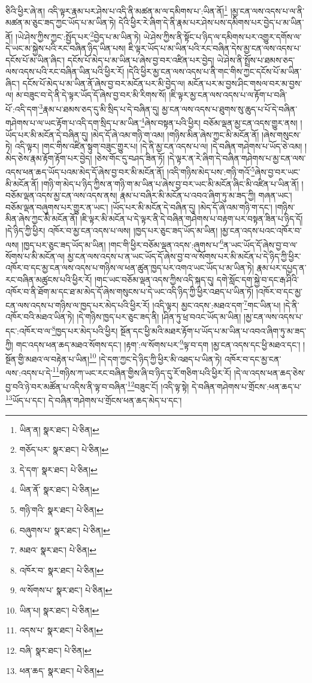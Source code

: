 ཅིའི་ཕྱིར་ཞེ་ན། འདི་ལྟར་རྣམ་པར་ཤེས་པ་འདི་ནི་མཚན་མ་ལ་དམིགས་པ་:ཡིན་ནོ།\footnote{ཡིན་ན།  སྣར་ཐང་།  པེ་ཅིན། } །མྱ་ངན་ལས་འདས་པ་ལ་ནི་མཚན་མ་ཅུང་ཟད་ཀྱང་ཡོད་པ་མ་ཡིན་ཏེ། དེའི་ཕྱིར་རེ་ཞིག་དེ་ནི་རྣམ་པར་ཤེས་པས་དམིགས་པར་བྱེད་པ་མ་ཡིན་ནོ། །ཡེ་ཤེས་ཀྱིས་ཀྱང་:སྤྱོད་པར་\footnote{གཅོད་པར་  སྣར་ཐང་།  པེ་ཅིན། }བྱེད་པ་མ་ཡིན་ཏེ། ཡེ་ཤེས་ཀྱིས་ནི་སྟོང་པ་ཉིད་ལ་དམིགས་པར་འགྱུར་དགོས་ལ་དེ་ཡང་མ་སྐྱེས་པའི་རང་བཞིན་ཉིད་ཡིན་པས། ཇི་ལྟར་ཡོད་པ་མ་ཡིན་པའི་རང་བཞིན་དེས་མྱ་ངན་ལས་འདས་པ་དངོས་པོ་མ་ཡིན་ཞིང་། དངོས་པོ་མེད་པ་མ་ཡིན་པ་ཞེས་བྱ་བར་འཛིན་པར་བྱེད། ཡེ་ཤེས་ནི་སྤྲོས་པ་ཐམས་ཅད་ལས་འདས་པའི་རང་བཞིན་ཡིན་པའི་ཕྱིར་རོ། །དེའི་ཕྱིར་མྱ་ངན་ལས་འདས་པ་ནི་གང་གིས་ཀྱང་དངོས་པོ་མ་ཡིན་ཞིང་། དངོས་པོ་མེད་པ་མ་ཡིན་ནོ་ཞེས་བྱ་བར་མངོན་པར་མི་བྱེད་ལ། མངོན་པར་མ་བྱས་ཤིང་གསལ་བར་མ་བྱས་ལ། མ་བཟུང་བ་དེ་ནི་དེ་ལྟར་ཡོད་དོ་ཞེས་བྱ་བར་མི་རིགས་སོ། །ཇི་ལྟར་མྱ་ངན་ལས་འདས་པ་ལ་རྟོག་པ་བཞི་པོ་:འདི་དག་\footnote{དེ་དག་  སྣར་ཐང་།  པེ་ཅིན། }རྣམ་པ་ཐམས་ཅད་དུ་མི་སྲིད་པ་དེ་བཞིན་དུ། མྱ་ངན་ལས་འདས་པ་ཐུགས་སུ་ཆུད་པ་པོ་དེ་བཞིན་གཤེགས་པ་ལ་ཡང་རྟོག་པ་འདི་དག་སྲིད་པ་མ་ཡིན་\footnote{ཡིན་ནོ་  སྣར་ཐང་།  པེ་ཅིན། }ཞེས་བསྟན་པའི་ཕྱིར། བཅོམ་ལྡན་མྱ་ངན་འདས་གྱུར་ནས། །ཡོད་པར་མི་མངོན་དེ་བཞིན་དུ། །མེད་དོ་ཞེ་འམ་གཉི་ག་འམ། །གཉིས་མིན་ཞེས་ཀྱང་མི་མངོན་ནོ། །ཞེས་གསུངས་ཏེ། འདི་ལྟར། །གང་གིས་འཛིན་སྟུག་བཟུང་གྱུར་པ། །དེ་ནི་མྱ་ངན་འདས་པ་ལ། །དེ་བཞིན་གཤེགས་པ་ཡོད་ཅེ་འམ། །མེད་ཅེས་རྣམ་རྟོག་རྟོག་པར་བྱེད། །ཅེས་གོང་དུ་བཤད་ཟིན་ཏོ། །དེ་ལྟར་ན་རེ་ཞིག་དེ་བཞིན་གཤེགས་པ་མྱ་ངན་ལས་འདས་ཕན་ཆད་ཡོད་པའམ་མེད་དོ་ཞེས་བྱ་བར་མི་མངོན་ནོ། །འདི་གཉིས་མེད་པས་:གཉི་གའོ་\footnote{གཉི་གའི་  སྣར་ཐང་།  པེ་ཅིན། }ཞེས་བྱ་བར་ཡང་མི་མངོན་ནོ། །གཉི་ག་མེད་པ་ཉིད་ཀྱིས་ན་གཉི་ག་མ་ཡིན་པ་ཞེས་བྱ་བར་ཡང་མི་མངོན་ཞིང་མི་འཛིན་པ་ཡིན་ནོ། །བཅོམ་ལྡན་འདས་མྱ་ངན་ལས་འདས་ནས། རྣམ་པ་བཞིར་མི་མངོན་པ་འབའ་ཞིག་ཏུ་མ་ཟད་ཀྱི། གཞན་ཡང་། བཅོམ་ལྡན་བཞུགས་པར་གྱུར་ན་ཡང་། །ཡོད་པར་མི་མངོན་དེ་བཞིན་དུ། །མེད་དོ་ཞེ་འམ་གཉི་ག་དང་། །གཉིས་མིན་ཞེས་ཀྱང་མི་མངོན་ནོ། །ཇི་ལྟར་མི་མངོན་པ་དེ་ལྟར་ནི་དེ་བཞིན་གཤེགས་པ་བརྟག་པར་བསྟན་ཟིན་པ་ཉིད་དོ། །དེ་ཉིད་ཀྱི་ཕྱིར། འཁོར་བ་མྱ་ངན་འདས་པ་ལས། །ཁྱད་པར་ཅུང་ཟད་ཡོད་མ་ཡིན། །མྱ་ངན་འདས་པའང་འཁོར་བ་ལས། །ཁྱད་པར་ཅུང་ཟད་ཡོད་མ་ཡིན། །གང་གི་ཕྱིར་བཅོམ་ལྡན་འདས་:ཞུགས་པ་\footnote{བཞུགས་པ་  སྣར་ཐང་།  པེ་ཅིན། }ན་ཡང་ཡོད་དོ་ཞེས་བྱ་བ་ལ་སོགས་པ་མི་མངོན་ལ། མྱ་ངན་ལས་འདས་པ་ན་ཡང་ཡོད་དོ་ཞེས་བྱ་བ་ལ་སོགས་པར་མི་མངོན་པ་དེ་ཉིད་ཀྱི་ཕྱིར་འཁོར་བ་དང་མྱ་ངན་ལས་འདས་པ་གཉིས་ལ་ཕན་ཚུན་ཁྱད་པར་འགའ་ཡང་ཡོད་པ་མ་ཡིན་ཏེ། རྣམ་པར་དཔྱད་ན་རང་བཞིན་མཚུངས་པའི་ཕྱིར་རོ། །གང་ཡང་བཅོམ་ལྡན་འདས་ཀྱིས་འདི་སྐད་དུ། དགེ་སློང་དག་སྐྱེ་བ་དང་རྒ་ཤིའི་འཁོར་བ་ནི་ཐོག་མ་དང་ཐ་མ་མེད་དོ་ཞེས་གསུངས་པ་དེ་ཡང་འདི་ཉིད་ཀྱི་ཕྱིར་འཐད་པ་ཡིན་ཏོ། །འཁོར་བ་དང་མྱ་ངན་ལས་འདས་པ་གཉིས་ལ་ཁྱད་པར་མེད་པའི་ཕྱིར་རོ། །འདི་ལྟར། མྱང་འདས་:མཐའ་དག་\footnote{མཐའ་  སྣར་ཐང་།  པེ་ཅིན། }གང་ཡིན་པ། །དེ་ནི་འཁོར་བའི་མཐའ་ཡིན་ཏེ། །དེ་གཉིས་ཁྱད་པར་ཅུང་ཟད་ནི། །ཤིན་ཏུ་ཕྲ་བའང་ཡོད་མ་ཡིན། །མྱ་ངན་ལས་འདས་པ་དང་:འཁོར་བ་ལ་\footnote{འཁོར་བ་  སྣར་ཐང་།  པེ་ཅིན། }ཁྱད་པར་མེད་པའི་ཕྱིར། སྔོན་དང་ཕྱི་མའི་མཐར་རྟོག་པ་ཡོད་པ་མ་ཡིན་པ་འབའ་ཞིག་ཏུ་མ་ཟད་ཀྱི། གང་འདས་ཕན་ཆད་མཐའ་སོགས་དང་། །རྟག་:ལ་སོགས་པར་\footnote{ལ་སོགས་པ་  སྣར་ཐང་།  པེ་ཅིན། }ལྟ་བ་དག །མྱ་ངན་འདས་དང་ཕྱི་མཐའ་དང་། །སྔོན་གྱི་མཐའ་ལ་བརྟེན་པ་ཡིན།\footnote{ཡིན་པ།  སྣར་ཐང་།  པེ་ཅིན། } །དེ་དག་ཀྱང་དེ་ཉིད་ཀྱི་ཕྱིར་མི་འཐད་པ་ཡིན་ཏེ། འཁོར་བ་དང་མྱ་ངན་ལས་:འདས་པ་དེ་\footnote{འདས་པ་  སྣར་ཐང་།  པེ་ཅིན། }གཉིས་ཀ་ཡང་རང་བཞིན་གྱིས་ཞི་བ་ཉིད་དུ་རོ་གཅིག་པའི་ཕྱིར་རོ། །དེ་ལ་འདས་ཕན་ཆད་ཅེས་བྱ་བའི་ཉེ་བར་མཚོན་པ་འདིས་ནི་ལྟ་བ་བཞིན་\footnote{བཞི་  སྣར་ཐང་།  པེ་ཅིན། }བཟུང་ངོ། །འདི་ལྟ་སྟེ། དེ་བཞིན་གཤེགས་པ་གྲོངས་:ཕན་ཆད་པ་\footnote{ཕན་ཆད་  སྣར་ཐང་།  པེ་ཅིན། }ཡོད་པ་དང་། དེ་བཞིན་གཤེགས་པ་གྲོངས་ཕན་ཆད་མེད་པ་དང་། 